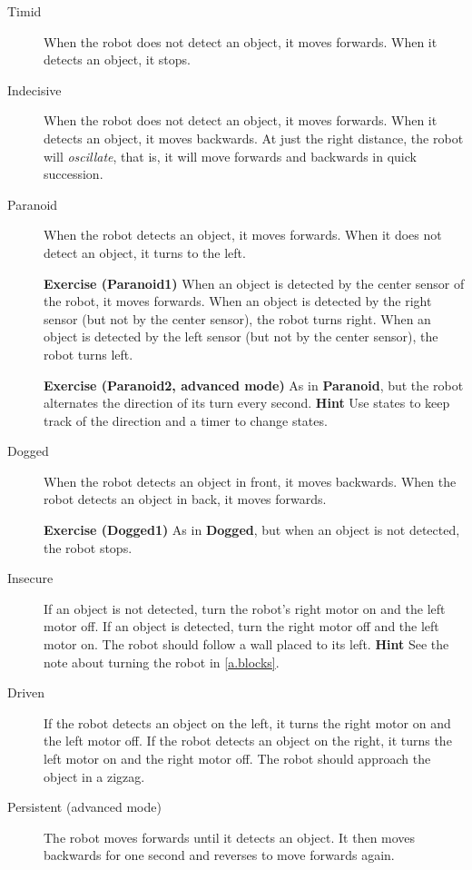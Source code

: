 \begin{description}

\item[Timid] When the robot does not detect an object, it moves forwards.
When it detects an object, it stops.

\item[Indecisive] When the robot does not detect an object, it moves
forwards. When it detects an object, it moves backwards. At just the
right distance, the robot will \emph{oscillate}, that is, it will move
forwards and backwards in quick succession.

\item[Paranoid] When the robot detects an object, it moves forwards. When
it does not detect an object, it turns to the left.

\textbf{Exercise (Paranoid1)} When an object is detected by the center
sensor of the robot, it moves forwards. When an object is detected by
the right sensor (but not by the center sensor), the robot turns right.
When an object is detected by the left sensor (but not by the center
sensor), the robot turns left.

\textbf{Exercise (Paranoid2, advanced mode)} As in \textbf{Paranoid}, but the
robot alternates the direction of its turn every second. \textbf{Hint}
Use states to keep track of the direction and a timer to change states.

\item[Dogged] When the robot detects an object in front, it moves
backwards. When the robot detects an object in back, it moves forwards.

\textbf{Exercise (Dogged1)} As in \textbf{Dogged}, but when an
object is not detected, the robot stops.

\item[Insecure] If an object is not detected, turn the robot's right
motor on and the left motor off. If an object is detected, turn the
right motor off and the left motor on. The robot should follow a wall
placed to its left. \textbf{Hint} See the note about turning the robot in \cref{a.blocks}.

\item[Driven] If the robot detects an object on the left, it turns the
right motor on and the left motor off. If the robot detects an object on
the right, it turns the left motor on and the right motor off. The robot
should approach the object in a zigzag.

\item[Persistent (advanced mode)] The robot moves forwards until it detects
an object. It then moves backwards for one second and reverses to move
forwards again.


\end{description}
